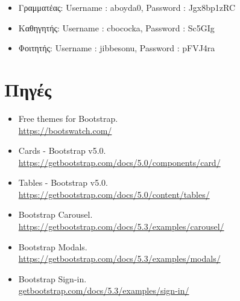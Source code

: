 \documentclass[12pt]{article}
\begin{document}
\begin{itemize}
	\item Γραμματέας: Username : aboyda0, Password : Jgx8bp1zRC
	\item Καθηγητής: Username : cbococka, Password : Sc5GIg
	\item Φοιτητής: Username : jibbesonu, Password : pFVJ4ra
\end{itemize}

\section{Πηγές}

\begin{itemize}
	\item Free themes for Bootstrap.\\
	\url{https://bootswatch.com/}
	
	\item Cards - Bootstrap v5.0.\\
	\url{https://getbootstrap.com/docs/5.0/components/card/}
	
	\item Tables - Bootstrap v5.0.\\
	\url{https://getbootstrap.com/docs/5.0/content/tables/}
	
	\item Bootstrap Carousel.\\
	\url{https://getbootstrap.com/docs/5.3/examples/carousel/}
	
	\item Bootstrap Modals.\\
	\url{https://getbootstrap.com/docs/5.3/examples/modals/}
	
	\item Bootstrap Sign-in.\\
	\url{getbootstrap.com/docs/5.3/examples/sign-in/}
\end{itemize}
\end{document}
